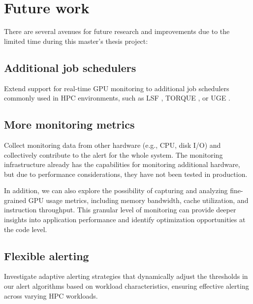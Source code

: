
\section{Future work}
There are several avenues for future research and improvements due to the limited time during this master's thesis project:

\subsection{Additional job schedulers}
Extend support for real-time GPU monitoring to additional job schedulers commonly used in HPC environments, such as LSF \cite{10.1145/3569951.3597564}, TORQUE \cite{10.1145/1188455.1188464}, or UGE \cite{10.1145/3332186.3338408}.

\subsection{More monitoring metrics}
Collect monitoring data from other hardware (e.g., CPU, disk I/O) and collectively contribute to the alert for the whole system. The monitoring infrastructure already has the capabilities for monitoring additional hardware, but due to performance considerations, they have not been tested in production.

In addition, we can also explore the possibility of capturing and analyzing fine-grained GPU usage metrics, including memory bandwidth, cache utilization, and instruction throughput. This granular level of monitoring can provide deeper insights into application performance and identify optimization opportunities at the code level.

\subsection{Flexible alerting}
Investigate adaptive alerting strategies that dynamically adjust the thresholds in our alert algorithms based on workload characteristics, ensuring effective alerting across varying HPC workloads.

